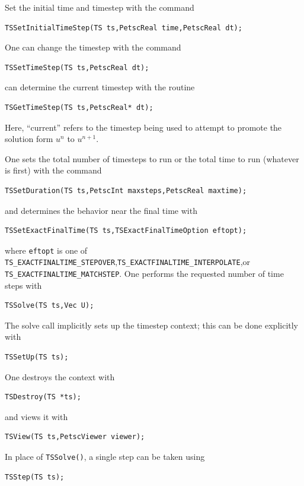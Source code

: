 \noindent Set the initial time and timestep with the command
\begin{lstlisting}
TSSetInitialTimeStep(TS ts,PetscReal time,PetscReal dt);
\end{lstlisting}
One can change the timestep with the command
\begin{lstlisting}
TSSetTimeStep(TS ts,PetscReal dt);
\end{lstlisting}
can determine the current timestep with the routine
\begin{lstlisting}
TSGetTimeStep(TS ts,PetscReal* dt);
\end{lstlisting}
Here, ``current'' refers to the timestep being used to attempt to
promote the solution form $ u^n $ to $ u^{n+1}. $

\noindent One sets the total number of timesteps to run or the total time to run
(whatever is first) with the command
\begin{lstlisting}
TSSetDuration(TS ts,PetscInt maxsteps,PetscReal maxtime);
\end{lstlisting}
and determines the behavior near the final time with
\begin{lstlisting}
TSSetExactFinalTime(TS ts,TSExactFinalTimeOption eftopt);
\end{lstlisting}
where \lstinline{eftopt} is one of \lstinline{TS_EXACTFINALTIME_STEPOVER},\lstinline{TS_EXACTFINALTIME_INTERPOLATE},or \lstinline{TS_EXACTFINALTIME_MATCHSTEP}.
One performs the requested number of time steps with
\begin{lstlisting}
TSSolve(TS ts,Vec U);
\end{lstlisting}
The solve call implicitly sets up the timestep context;
this can be done explicitly with
\begin{lstlisting}
TSSetUp(TS ts);
\end{lstlisting}
One destroys the context with
\begin{lstlisting}
TSDestroy(TS *ts);
\end{lstlisting}
and views it with
\begin{lstlisting}
TSView(TS ts,PetscViewer viewer);
\end{lstlisting}
In place of \lstinline{TSSolve()}, a single step can be taken using
\begin{lstlisting}
TSStep(TS ts);
\end{lstlisting}


